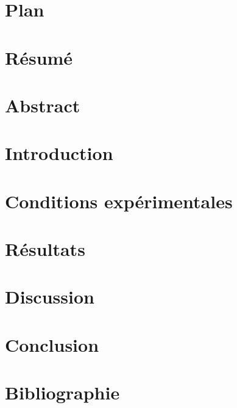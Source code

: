 \documentclass{article}
\begin{document}


\section*{Plan}


\section*{Résumé}


\section*{Abstract}


\section*{Introduction}


\section*{Conditions expérimentales}


\section*{Résultats}


\section*{Discussion}


\section*{Conclusion}


\section*{Bibliographie}
\end{document}
